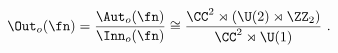 \begin{equation*}
  \Out_o(\fn) = \frac{\Aut_o(\fn)}{\Inn_o(\fn)} \cong \frac{\CC^2
  \rtimes (\U(2) \rtimes \ZZ_2)}{\CC^2 \rtimes \U(1)}~.
\end{equation*}

